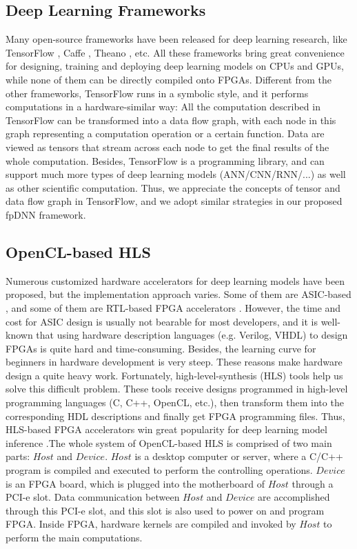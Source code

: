 \documentclass{acm_proc_article-sp-copy}
\begin{document}
\subsection{Deep Learning Frameworks}
Many open-source frameworks have been released for deep learning research, like TensorFlow \cite{tensorflow}, Caffe \cite{caffe}, Theano \cite{theano}, etc. All these frameworks bring great convenience for designing, training and deploying deep learning models on CPUs and GPUs, while none of them can be directly compiled onto FPGAs. Different from the other frameworks, TensorFlow runs in a symbolic style, and it performs computations in a hardware-similar way: All the computation described in TensorFlow can be transformed into a data flow graph, with each node in this graph representing a computation operation or a certain function. Data are viewed as tensors that stream across each node to get the final results of the whole computation. Besides, TensorFlow is a programming library, and can support much more types of deep learning models (ANN/CNN/RNN/...) as well as other scientific computation. Thus, we appreciate the concepts of tensor and data flow graph in TensorFlow, and we adopt similar strategies in our proposed fpDNN framework.

\subsection{OpenCL-based HLS}
Numerous customized hardware accelerators for deep learning models have been proposed, but the implementation approach varies. Some of them are ASIC-based \cite{dadiannao} \cite{isscc.1} \cite{isscc.2}, and some of them are RTL-based FPGA accelerators \cite{fccm'15}. However, the time and cost for ASIC design is usually not bearable for most developers, and it is well-known that using hardware description languages (e.g. Verilog, VHDL) to design FPGAs is quite hard and time-consuming. Besides, the learning curve for beginners in hardware development is very steep. These reasons make hardware design a quite heavy work. Fortunately, high-level-synthesis (HLS) tools help us solve this difficult problem. These tools receive designs programmed in high-level programming languages (C, C++, OpenCL, etc.), then transform them into the corresponding HDL descriptions and finally get FPGA programming files. Thus, HLS-based FPGA accelerators win great popularity for deep learning model inference \cite{fpga'15} \cite{fpga'16} \cite{aeye}.The whole system of OpenCL-based HLS is comprised of two main parts: $Host$ and $Device$. $Host$ is a desktop computer or server, where a C/C++ program is compiled and executed to perform the controlling operations. $Device$ is an FPGA board, which is plugged into the motherboard of $Host$ through a PCI-e slot. Data communication between $Host$ and $Device$ are accomplished through this PCI-e slot, and this slot is also used to power on and program FPGA. Inside FPGA, hardware kernels are compiled and invoked by $Host$ to perform the main computations.
\end{document}
